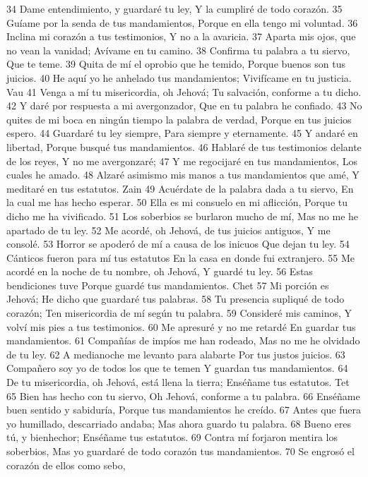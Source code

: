 34 Dame entendimiento, y guardaré tu ley,
Y la cumpliré de todo corazón.
35 Guíame por la senda de tus mandamientos,
Porque en ella tengo mi voluntad.
36 Inclina mi corazón a tus testimonios,
Y no a la avaricia.
37 Aparta mis ojos, que no vean la vanidad;
Avívame en tu camino.
38 Confirma tu palabra a tu siervo,
Que te teme.
39 Quita de mí el oprobio que he temido,
Porque buenos son tus juicios.
40 He aquí yo he anhelado tus mandamientos;
Vivifícame en tu justicia.
Vau
41 Venga a mí tu misericordia, oh Jehová;
Tu salvación, conforme a tu dicho.
42 Y daré por respuesta a mi avergonzador,
Que en tu palabra he confiado.
43 No quites de mi boca en ningún tiempo la palabra de verdad,
Porque en tus juicios espero.
44 Guardaré tu ley siempre,
Para siempre y eternamente.
45 Y andaré en libertad,
Porque busqué tus mandamientos.
46 Hablaré de tus testimonios delante de los reyes,
Y no me avergonzaré;
47 Y me regocijaré en tus mandamientos,
Los cuales he amado.
48 Alzaré asimismo mis manos a tus mandamientos que amé,
Y meditaré en tus estatutos.
Zain
49 Acuérdate de la palabra dada a tu siervo,
En la cual me has hecho esperar.
50 Ella es mi consuelo en mi aflicción,
Porque tu dicho me ha vivificado.
51 Los soberbios se burlaron mucho de mí,
Mas no me he apartado de tu ley.
52 Me acordé, oh Jehová, de tus juicios antiguos,
Y me consolé.
53 Horror se apoderó de mí a causa de los inicuos
Que dejan tu ley.
54 Cánticos fueron para mí tus estatutos
En la casa en donde fui extranjero.
55 Me acordé en la noche de tu nombre, oh Jehová,
Y guardé tu ley.
56 Estas bendiciones tuve
Porque guardé tus mandamientos.
Chet
57 Mi porción es Jehová;
He dicho que guardaré tus palabras.
58 Tu presencia supliqué de todo corazón;
Ten misericordia de mí según tu palabra.
59 Consideré mis caminos,
Y volví mis pies a tus testimonios.
60 Me apresuré y no me retardé
En guardar tus mandamientos.
61 Compañías de impíos me han rodeado,
Mas no me he olvidado de tu ley.
62 A medianoche me levanto para alabarte
Por tus justos juicios.
63 Compañero soy yo de todos los que te temen
Y guardan tus mandamientos.
64 De tu misericordia, oh Jehová, está llena la tierra;
Enséñame tus estatutos.
Tet
65 Bien has hecho con tu siervo,
Oh Jehová, conforme a tu palabra.
66 Enséñame buen sentido y sabiduría,
Porque tus mandamientos he creído.
67 Antes que fuera yo humillado, descarriado andaba;
Mas ahora guardo tu palabra.
68 Bueno eres tú, y bienhechor;
Enséñame tus estatutos.
69 Contra mí forjaron mentira los soberbios,
Mas yo guardaré de todo corazón tus mandamientos.
70 Se engrosó el corazón de ellos como sebo,
